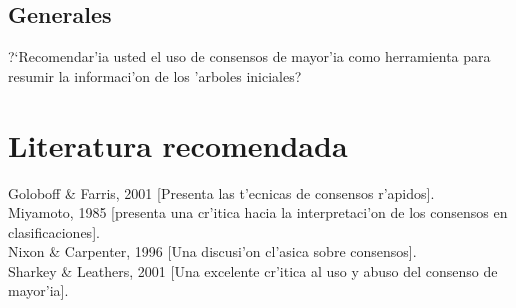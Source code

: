 \subsection{Generales}
\noindent
?`Recomendar'ia usted el uso de consensos de mayor'ia como herramienta para resumir la informaci'on de los 'arboles iniciales?
\section{Literatura recomendada}
\noindent
Goloboff \& Farris, 2001 [Presenta las t'ecnicas de consensos r'apidos].\\
Miyamoto, 1985 [presenta una cr'itica hacia la interpretaci'on de los consensos en clasificaciones].\\
Nixon \& Carpenter, 1996 [Una discusi'on cl'asica sobre consensos].\\
Sharkey \& Leathers, 2001 [Una excelente cr'itica al uso y abuso del consenso de mayor'ia].